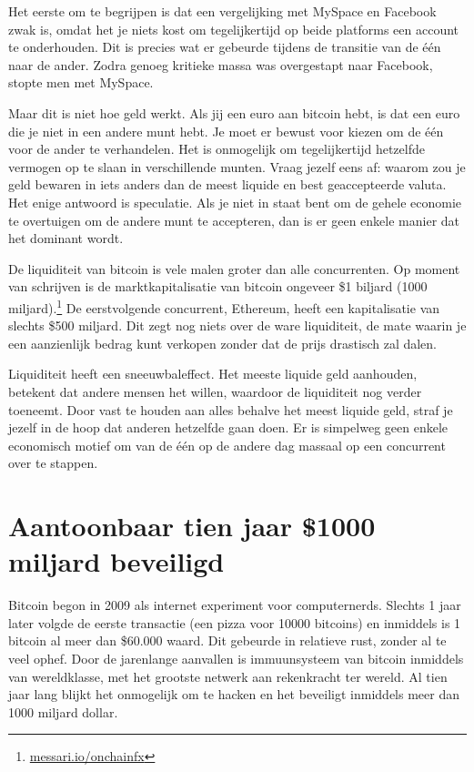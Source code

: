 \documentclass[
  letterpaper,
]{scrbook}
\begin{document}
Het eerste om te begrijpen is dat een vergelijking met MySpace en
Facebook zwak is, omdat het je niets kost om tegelijkertijd op beide
platforms een account te onderhouden. Dit is precies wat er gebeurde
tijdens de transitie van de één naar de ander. Zodra genoeg kritieke
massa was overgestapt naar Facebook, stopte men met MySpace.

Maar dit is niet hoe geld werkt. Als jij een euro aan bitcoin hebt, is
dat een euro die je niet in een andere munt hebt. Je moet er bewust voor
kiezen om de één voor de ander te verhandelen. Het is onmogelijk om
tegelijkertijd hetzelfde vermogen op te slaan in verschillende munten.
Vraag jezelf eens af: waarom zou je geld bewaren in iets anders dan de
meest liquide en best geaccepteerde valuta. Het enige antwoord is
speculatie. Als je niet in staat bent om de gehele economie te
overtuigen om de andere munt te accepteren, dan is er geen enkele manier
dat het dominant wordt.

De liquiditeit van bitcoin is vele malen groter dan alle concurrenten.
Op moment van schrijven is de marktkapitalisatie van bitcoin ongeveer
\$1 biljard (1000 miljard).\footnote{\href{https://messari.io/onchainfx}{messari.io/onchainfx}}
De eerstvolgende concurrent, Ethereum, heeft een kapitalisatie van
slechts \$500 miljard. Dit zegt nog niets over de ware liquiditeit, de
mate waarin je een aanzienlijk bedrag kunt verkopen zonder dat de prijs
drastisch zal dalen.

Liquiditeit heeft een sneeuwbaleffect. Het meeste liquide geld
aanhouden, betekent dat andere mensen het willen, waardoor de
liquiditeit nog verder toeneemt. Door vast te houden aan alles behalve
het meest liquide geld, straf je jezelf in de hoop dat anderen hetzelfde
gaan doen. Er is simpelweg geen enkele economisch motief om van de één
op de andere dag massaal op een concurrent over te stappen.

\hypertarget{aantoonbaar-tien-jaar-1000-miljard-beveiligd}{%
\section{Aantoonbaar tien jaar \$1000 miljard
beveiligd}\label{aantoonbaar-tien-jaar-1000-miljard-beveiligd}}

Bitcoin begon in 2009 als internet experiment voor computernerds.
Slechts 1 jaar later volgde de eerste transactie (een pizza voor 10000
bitcoins) en inmiddels is 1 bitcoin al meer dan \$60.000 waard. Dit
gebeurde in relatieve rust, zonder al te veel ophef. Door de jarenlange
aanvallen is immuunsysteem van bitcoin inmiddels van wereldklasse, met
het grootste netwerk aan rekenkracht ter wereld. Al tien jaar lang
blijkt het onmogelijk om te hacken en het beveiligt inmiddels meer dan
1000 miljard dollar.
\end{document}
